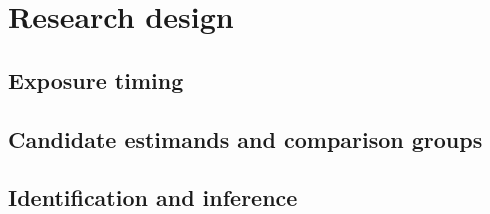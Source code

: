 \section{Research design}
\subsection{Exposure timing}
\subsection{Candidate estimands and comparison groups}
\subsection{Identification and inference}

